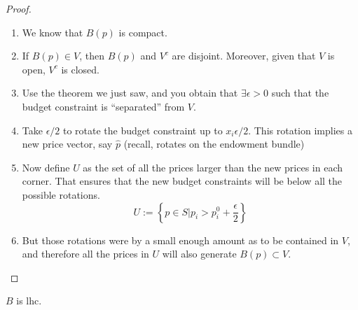\documentclass[aspectratio=169, handout]{beamer}
\begin{document}
\begin{frame}
    \begin{proof}
        \begin{enumerate}
            \item We know that $B(p)$ is compact.
            \item If $B(p)\in V$, then $B(p)$ and $V^c$ are disjoint. Moreover, given that $V$ is open, $V^c$ is closed.
            \item Use the theorem we just saw, and you obtain that $\exists \epsilon > 0$ such that the budget constraint is ``separated'' from $V$.
            \item Take $\epsilon/2$ to rotate the budget constraint up to $x_i\epsilon/2$. This rotation implies a new price vector, say $\hat{p}$ (recall, rotates on the endowment bundle)
            \item Now define $U$ as the set of all the prices larger than the new prices in each corner. That ensures that the new budget constraints will be below all the possible rotations.\[U:=\left\{p\in S| p_i>p_i^0+\frac{\epsilon}{2}\right\}\]
            \item But those rotations were by a small enough amount as to be contained in $V$, and therefore all the prices in $U$ will also generate $B(p)\subset V$.
        \end{enumerate}
    \end{proof}
\end{frame}

\begin{frame}
    \begin{figure}
    \end{figure}
\end{frame}

\begin{frame}
    \begin{theorem}
        $B$ is lhc.
    \end{theorem}
\end{frame}
\end{document}
